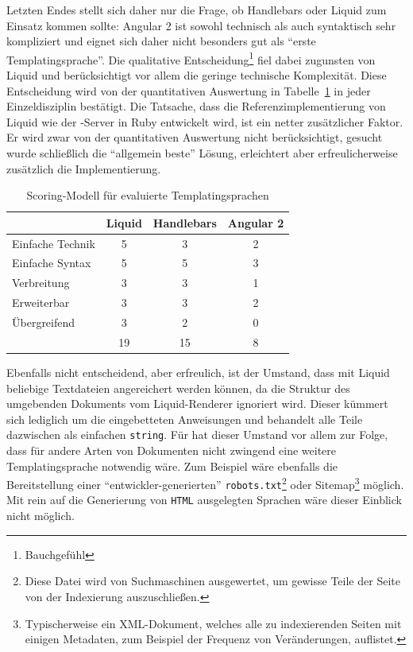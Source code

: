 Letzten Endes stellt sich daher nur die Frage, ob Handlebars oder Liquid zum Einsatz kommen sollte: Angular 2 ist sowohl technisch als auch syntaktisch sehr kompliziert und eignet sich daher nicht besonders gut als "`erste Templatingsprache"'. Die qualitative Entscheidung\footnote{Bauchgefühl} fiel dabei zugunsten von Liquid und berücksichtigt vor allem die geringe technische Komplexität. Diese Entscheidung wird von der quantitativen Auswertung in Tabelle~\ref{tab:scoring-templating-language} in jeder Einzeldisziplin bestätigt. Die Tatsache, dass die Referenzimplementierung von Liquid wie der \idename{}-Server in Ruby entwickelt wird, ist ein netter zusätzlicher Faktor. Er wird zwar von der quantitativen Auswertung nicht berücksichtigt, gesucht wurde schließlich die "`allgemein beste"' Lösung, erleichtert aber erfreulicherweise zusätzlich die Implementierung.

\begin{table}[h]
  \centering
  \begin{tabular}{ l c c c }
                      & Liquid   & Handlebars      & Angular 2   \\
    \hline
    Einfache Technik  & 5        & 3               & 2           \\
    Einfache Syntax   & 5        & 5               & 3           \\
    Verbreitung       & 3        & 3               & 1           \\
    Erweiterbar       & 3        & 3               & 2           \\
    Übergreifend      & 3        & 2               & 0           \\
    \hline \hline
                      & 19       & 15              & 8
  \end{tabular}
  \caption{Scoring-Modell für evaluierte Templatingsprachen}
  \label{tab:scoring-templating-language}
\end{table}

Ebenfalls nicht entscheidend, aber erfreulich, ist der Umstand, dass mit Liquid beliebige Textdateien angereichert werden können, da die Struktur des umgebenden Dokuments vom Liquid-Renderer ignoriert wird. Dieser kümmert sich lediglich um die eingebetteten Anweisungen und behandelt alle Teile dazwischen als einfachen \texttt{string}. Für \idename{} hat dieser Umstand vor allem zur Folge, dass für andere Arten von Dokumenten nicht zwingend eine weitere Templatingsprache notwendig wäre. Zum Beispiel wäre ebenfalls die Bereitstellung einer "`entwickler-generierten"' \texttt{robots.txt}\footnote{Diese Datei wird von Suchmaschinen ausgewertet, um gewisse Teile der Seite von der Indexierung auszuschließen.} oder Sitemap\footnote{Typischerweise ein XML-Dokument, welches alle zu indexierenden Seiten mit einigen Metadaten, zum Beispiel der Frequenz von Veränderungen, auflistet.} möglich. Mit rein auf die Generierung von \texttt{HTML} ausgelegten Sprachen wäre dieser Einblick nicht möglich.

